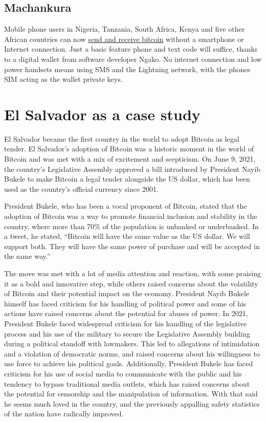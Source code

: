 \subsection{Machankura}
Mobile phone users in Nigeria, Tanzania, South Africa, Kenya and five other African countries can now \href{https://www.forbes.com/sites/digital-assets/2023/03/15/how-africans-are-using-bitcoin-without-internet-access/?sh=434df18b7428}{send and receive bitcoin} without a smartphone or Internet connection. Just a basic feature phone and text code will suffice, thanks to a digital wallet from software developer Ngako. No internet connection and low power handsets means using SMS and the Lightning network, with the phones SIM acting as the wallet private keys.
\section{El Salvador as a case study}
El Salvador became the first country in the world to adopt Bitcoin as legal tender. El Salvador's adoption of Bitcoin was a historic moment in the world of Bitcoin and was met with a mix of excitement and scepticism. On June 9, 2021, the country's Legislative Assembly approved a bill introduced by President Nayib Bukele to make Bitcoin a legal tender alongside the US dollar, which has been used as the country's official currency since 2001.\par
President Bukele, who has been a vocal proponent of Bitcoin, stated that the adoption of Bitcoin was a way to promote financial inclusion and stability in the country, where more than 70\% of the population is unbanked or underbanked. In a tweet, he stated, ``Bitcoin will have the same value as the US dollar. We will support both. They will have the same power of purchase and will be accepted in the same way.''\par
The move was met with a lot of media attention and reaction, with some praising it as a bold and innovative step, while others raised concerns about the volatility of Bitcoin and their potential impact on the economy. President Nayib Bukele himself has faced criticism for his handling of political power and some of his actions have raised concerns about the potential for abuses of power. In 2021, President Bukele faced widespread criticism for his handling of the legislative process and his use of the military to secure the Legislative Assembly building during a political standoff with lawmakers. This led to allegations of intimidation and a violation of democratic norms, and raised concerns about his willingness to use force to achieve his political goals. Additionally, President Bukele has faced criticism for his use of social media to communicate with the public and his tendency to bypass traditional media outlets, which has raised concerns about the potential for censorship and the manipulation of information. With that said he seems much loved in the country, and the previously appalling safety statistics of the nation have radically improved.\par
